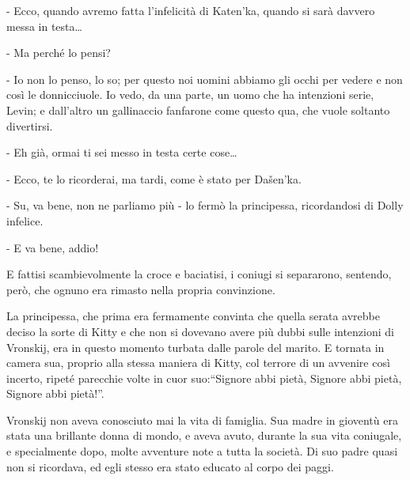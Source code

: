 - Ecco, quando avremo fatta l'infelicità di Katen'ka, quando si sarà davvero messa in testa\ldots{} 

- Ma perché lo pensi? 

- Io non lo penso, lo so; per questo noi uomini abbiamo gli occhi per vedere e non così le donnicciuole. Io vedo, da una parte, un uomo che ha intenzioni serie, Levin; e dall'altro un gallinaccio fanfarone come questo qua, che vuole soltanto divertirsi. 

- Eh già, ormai ti sei messo in testa certe cose\ldots{} 

- Ecco, te lo ricorderai, ma tardi, come è stato per Dašen'ka. 

- Su, va bene, non ne parliamo più - lo fermò la principessa, ricordandosi di Dolly infelice. 

- E va bene, addio! 

E fattisi scambievolmente la croce e baciatisi, i coniugi si separarono, sentendo, però, che ognuno era rimasto nella propria convinzione. 

La principessa, che prima era fermamente convinta che quella serata avrebbe deciso la sorte di Kitty e che non si dovevano avere più dubbi sulle intenzioni di Vronskij, era in questo momento turbata dalle parole del marito. E tornata in camera sua, proprio alla stessa maniera di Kitty, col terrore di un avvenire così incerto, ripeté parecchie volte in cuor suo:``Signore abbi pietà, Signore abbi pietà, Signore abbi pietà!''. 

\label{xvi} 

Vronskij non aveva conosciuto mai la vita di famiglia. Sua madre in gioventù era stata una brillante donna di mondo, e aveva avuto, durante la sua vita coniugale, e specialmente dopo, molte avventure note a tutta la società. Di suo padre quasi non si ricordava, ed egli stesso era stato educato al corpo dei paggi. 

